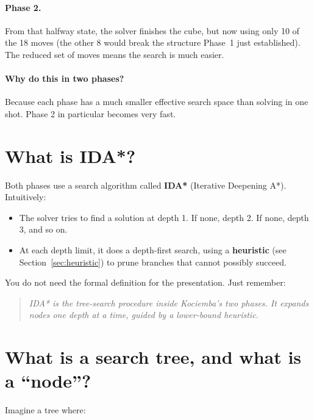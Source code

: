 \documentclass[11pt,a4paper]{article}
\newcommand{\defn}[1]{\textbf{#1}}
\newcommand{\qbox}[1]{\begin{quote}\small\textit{#1}\end{quote}}
\begin{document}
\paragraph{Phase 2.} From that halfway state, the solver finishes the
cube, but now using only 10 of the 18 moves (the other 8 would break
the structure Phase~1 just established). The reduced set of moves means
the search is much easier.

\paragraph{Why do this in two phases?} Because each phase has a much
smaller effective search space than solving in one shot. Phase 2 in
particular becomes very fast.

\section{What is IDA*?}

Both phases use a search algorithm called \defn{IDA*} (Iterative
Deepening A*). Intuitively:

\begin{itemize}[leftmargin=2em]
  \item The solver tries to find a solution at depth 1. If none, depth 2.
        If none, depth 3, and so on.
  \item At each depth limit, it does a depth-first search, using a
        \textbf{heuristic} (see Section~\ref{sec:heuristic}) to prune
        branches that cannot possibly succeed.
\end{itemize}

You do not need the formal definition for the presentation. Just remember:

\qbox{IDA* is the tree-search procedure inside Kociemba's two phases. It
expands nodes one depth at a time, guided by a lower-bound heuristic.}

\section{What is a search tree, and what is a ``node''?}

Imagine a tree where:
\end{document}
